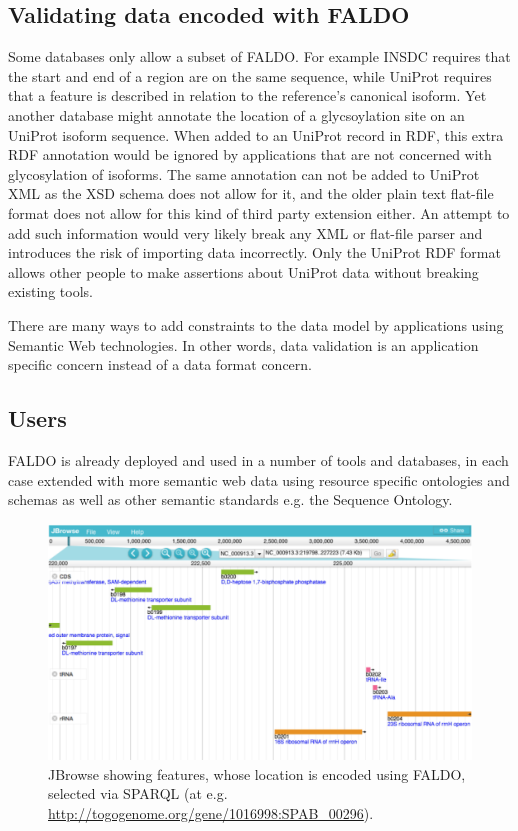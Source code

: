 \subsection*{Validating data encoded with FALDO}

Some databases only allow a subset of FALDO. 
For example INSDC requires that the start and end of a region are on the same sequence,
while UniProt requires that a feature is described in relation to the reference's canonical isoform.
Yet another database might annotate the location of a glycsoylation site on an UniProt isoform sequence.
When added to an UniProt record in RDF, this extra RDF annotation would be ignored by applications that are not concerned with glycosylation of isoforms.
The same annotation can not be added to UniProt XML as the XSD schema does not allow for it,
and the older plain text flat-file format does not allow for this kind of third party extension either.
An attempt to add such information would very likely break any XML or flat-file parser and introduces the risk of importing data incorrectly.
Only the UniProt RDF format allows other people to make assertions about UniProt data without breaking existing tools.

There are many ways to add constraints to the data model by applications using Semantic Web technologies\cite{RDFValidationReport}.
In other words, data validation is an application specific concern instead of a data format concern.

\subsection*{Users}
FALDO is already deployed and used in a number of tools and databases, in each case extended with more semantic web data using resource specific ontologies and schemas as well as other semantic standards e.g. the Sequence Ontology.

\begin{figure}
\begin{center}
\includegraphics[width=16cm]{figures/togogenomes.pdf}
\end{center}
\caption{JBrowse showing features, whose location is encoded using FALDO, selected via SPARQL (at e.g. \protect\url{http://togogenome.org/gene/1016998:SPAB_00296}). }
\label{fig:jbrowse}
\end{figure}

